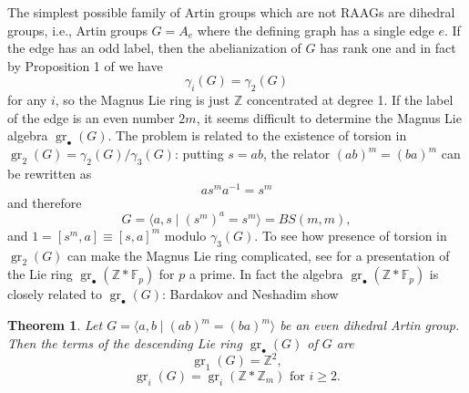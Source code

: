 \documentclass[10pt, oneside]{amsart}
\newcommand{\Z}{\mathbb{Z}} %
\newcommand{\F}{\mathbb{F}}
\newcommand{\gr}{\operatorname{gr}} %
\newtheorem{theorem}{Theorem}[section]
\theoremstyle{definition}
\theoremstyle{remark}
\theoremstyle{plain}
\begin{document}
The simplest possible family of Artin groups which are not RAAGs are dihedral groups, i.e., Artin groups $G=A_e$ where the defining graph has a single edge $e$. If the edge has an odd label, then the abelianization of $G$ has rank one and in fact by Proposition 1 of \cite{BGG} we have
$$\gamma_i(G)=\gamma_2(G)$$
for any $i$, so the Magnus Lie ring is just $\Z$ concentrated at degree 1.
 If the label of the edge is an even number $2m$, it seems difficult to determine the Magnus Lie algebra $\gr_\bullet(G)$. The problem is related to the existence of torsion in $\gr_2(G)=\gamma_2(G)/\gamma_3(G)$: putting  $s=ab$, the relator $(ab)^m=(ba)^m$ can be rewritten as
$$as^ma^{-1}=s^m$$
and therefore
$$G=\langle a,s\mid (s^m)^a=s^m\rangle=BS(m,m),$$
and $1=[s^m,a]\equiv [s,a]^m$ modulo $\gamma_3(G)$. To see how  presence of torsion in $\gr_2(G)$ can make the Magnus Lie ring complicated,  see  \cite{Labute1} for a presentation of the Lie ring  $\gr_\bullet(\Z\ast\F_p)$ for $p$ a prime. In fact the algebra $\gr_\bullet(\Z\ast\F_p)$ is closely related to $\gr_\bullet(G)$: Bardakov and Neshadim show

\begin{theorem}\cite[Proposition 2]{BardakovNeshchadim}\label{teo:BN} Let $G=\langle a,b\mid (ab)^m=(ba)^m\rangle$ be an even dihedral Artin group. Then the terms of the descending Lie ring $\gr_\bullet(G)$ of $G$ are
$$\gr_1(G)=\Z^2,$$
$$\gr_i(G)=\gr_i(\Z\ast\Z_m)\text{ for }i\geq 2.$$
\end{theorem}
\end{document}
